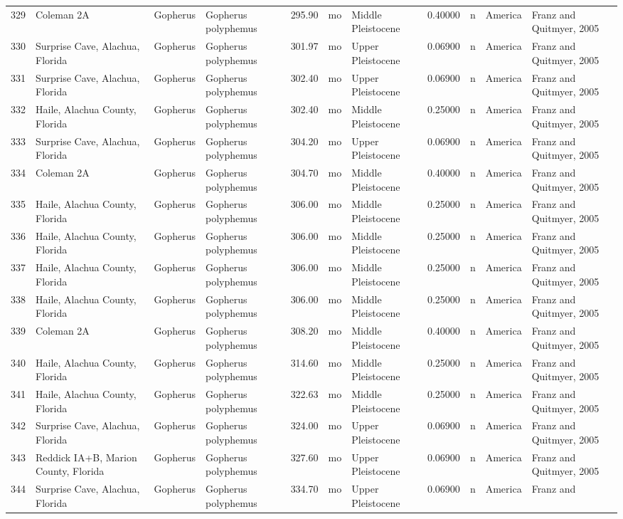 \documentclass[]{article}
\begin{document}
\begin{longtable}[]{@{}llllrllrlll@{}}
329 & Coleman 2A & Gopherus & Gopherus polyphemus & 295.90 & mo & Middle
Pleistocene & 0.40000 & n & America & Franz and Quitmyer,
2005\tabularnewline
330 & Surprise Cave, Alachua, Florida & Gopherus & Gopherus polyphemus &
301.97 & mo & Upper Pleistocene & 0.06900 & n & America & Franz and
Quitmyer, 2005\tabularnewline
331 & Surprise Cave, Alachua, Florida & Gopherus & Gopherus polyphemus &
302.40 & mo & Upper Pleistocene & 0.06900 & n & America & Franz and
Quitmyer, 2005\tabularnewline
332 & Haile, Alachua County, Florida & Gopherus & Gopherus polyphemus &
302.40 & mo & Middle Pleistocene & 0.25000 & n & America & Franz and
Quitmyer, 2005\tabularnewline
333 & Surprise Cave, Alachua, Florida & Gopherus & Gopherus polyphemus &
304.20 & mo & Upper Pleistocene & 0.06900 & n & America & Franz and
Quitmyer, 2005\tabularnewline
334 & Coleman 2A & Gopherus & Gopherus polyphemus & 304.70 & mo & Middle
Pleistocene & 0.40000 & n & America & Franz and Quitmyer,
2005\tabularnewline
335 & Haile, Alachua County, Florida & Gopherus & Gopherus polyphemus &
306.00 & mo & Middle Pleistocene & 0.25000 & n & America & Franz and
Quitmyer, 2005\tabularnewline
336 & Haile, Alachua County, Florida & Gopherus & Gopherus polyphemus &
306.00 & mo & Middle Pleistocene & 0.25000 & n & America & Franz and
Quitmyer, 2005\tabularnewline
337 & Haile, Alachua County, Florida & Gopherus & Gopherus polyphemus &
306.00 & mo & Middle Pleistocene & 0.25000 & n & America & Franz and
Quitmyer, 2005\tabularnewline
338 & Haile, Alachua County, Florida & Gopherus & Gopherus polyphemus &
306.00 & mo & Middle Pleistocene & 0.25000 & n & America & Franz and
Quitmyer, 2005\tabularnewline
339 & Coleman 2A & Gopherus & Gopherus polyphemus & 308.20 & mo & Middle
Pleistocene & 0.40000 & n & America & Franz and Quitmyer,
2005\tabularnewline
340 & Haile, Alachua County, Florida & Gopherus & Gopherus polyphemus &
314.60 & mo & Middle Pleistocene & 0.25000 & n & America & Franz and
Quitmyer, 2005\tabularnewline
341 & Haile, Alachua County, Florida & Gopherus & Gopherus polyphemus &
322.63 & mo & Middle Pleistocene & 0.25000 & n & America & Franz and
Quitmyer, 2005\tabularnewline
342 & Surprise Cave, Alachua, Florida & Gopherus & Gopherus polyphemus &
324.00 & mo & Upper Pleistocene & 0.06900 & n & America & Franz and
Quitmyer, 2005\tabularnewline
343 & Reddick IA+B, Marion County, Florida & Gopherus & Gopherus
polyphemus & 327.60 & mo & Upper Pleistocene & 0.06900 & n & America &
Franz and Quitmyer, 2005\tabularnewline
344 & Surprise Cave, Alachua, Florida & Gopherus & Gopherus polyphemus &
334.70 & mo & Upper Pleistocene & 0.06900 & n & America & Franz and

\end{longtable}
\end{document}
